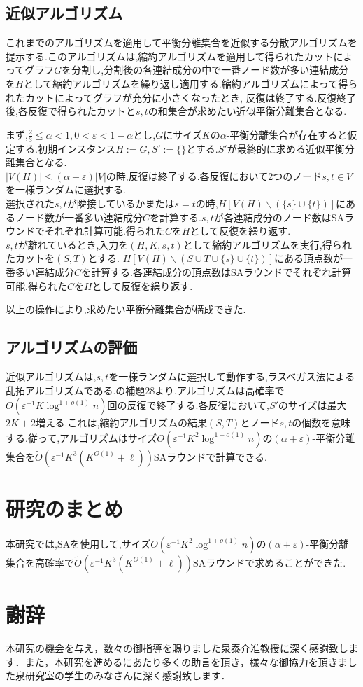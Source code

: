 \documentclass{thesis}
\theoremstyle{definition}
\begin{document}
\section{近似アルゴリズム}
これまでのアルゴリズムを適用して平衡分離集合を近似する分散アルゴリズムを提示する.このアルゴリズムは,縮約アルゴリズムを適用して得られたカットによってグラフ$G$を分割し,分割後の各連結成分の中で一番ノード数が多い連結成分を$H$として縮約アルゴリズムを繰り返し適用する.縮約アルゴリズムによって得られたカットによってグラフが充分に小さくなったとき, 反復は終了する.反復終了後,各反復で得られたカットと$s,t$の和集合が求めたい近似平衡分離集合となる.\par
まず,$\frac{2}{3} \leq \alpha < 1,0 < \varepsilon < 1-\alpha$とし,$G$にサイズ$K$の$\alpha$-平衡分離集合が存在すると仮定する.初期インスタンス$H:=G,S':= \{\}$とする.$S'$が最終的に求める近似平衡分離集合となる.\\
$|V(H)|\leq (\alpha + \varepsilon)|V|$の時,反復は終了する.各反復において2つのノード$s,t \in V$を一様ランダムに選択する.\\
選択された$s,t$が隣接しているかまたは$s = t$の時,$H[V(H) \backslash (\{s\} \cup \{t\})]$にあるノード数が一番多い連結成分$C$を計算する.$s,t$が各連結成分のノード数はSAラウンドでそれぞれ計算可能.得られた$C$を$H$として反復を繰り返す.\\
$s,t$が離れているとき,入力を$(H,K,s,t)$として縮約アルゴリズムを実行,得られたカットを$(S,T)$とする.
$H[V(H) \backslash (S \cup T \cup \{s\} \cup \{t\})]$にある頂点数が一番多い連結成分$C$を計算する.各連結成分の頂点数はSAラウンドでそれぞれ計算可能.得られた$C$を$H$として反復を繰り返す.\par
以上の操作により,求めたい平衡分離集合が構成できた.

\section{アルゴリズムの評価}
近似アルゴリズムは,$s,t$を一様ランダムに選択して動作する,ラスベガス法による乱拓アルゴリズムである.\cite{brandt2017approximating}の補題28より,アルゴリズムは高確率で$O(\varepsilon^{-1}K\log^{1+o(1)}n)$回の反復で終了する.各反復において,$S'$のサイズは最大$2K+2$増える.これは,縮約アルゴリズムの結果$(S,T)$とノード$s,t$の個数を意味する.従って,アルゴリズムはサイズ$O(\varepsilon^{-1}K^2\log^{1+o(1)}n)$の$(\alpha + \varepsilon)$-平衡分離集合を$\tilde{O}(\varepsilon^{-1}K^3(K^{O(1)}+\ell))$SAラウンドで計算できる.

\chapter{研究のまとめ}
本研究では,SAを使用して,サイズ$O(\varepsilon^{-1}K^2\log^{1+o(1)}n)$の$(\alpha + \varepsilon)$-平衡分離集合を高確率で$\tilde{O}(\varepsilon^{-1}K^3(K^{O(1)}+\ell))$SAラウンドで求めることができた.

\chapter{謝辞}
本研究の機会を与え，数々の御指導を賜りました泉泰介准教授に深く感謝致します．また，本研究を進めるにあたり多くの助言を頂き，様々な御協力を頂きました泉研究室の学生のみなさんに深く感謝致します．




%
\end{document}

